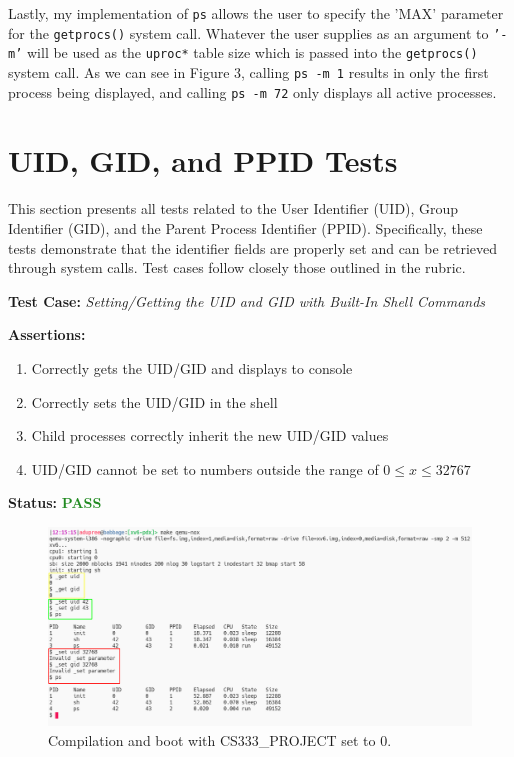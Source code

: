 \documentclass[11pt,letterpaper]{report}
\newcommand{\code}[1]{\colorbox{codegray}{\texttt{#1}}}
\begin{document}
{  Lastly, my implementation of \code{ps} allows the user to specify the 'MAX' parameter
  for the \code{getprocs()} system call. Whatever the user supplies as an argument to
  \code{'-m'} will be used as the \code{uproc*} table size which is passed into the
  \code{getprocs()} system call. As we can see in Figure 3, calling \code{ps -m 1} results
  in only the first process being displayed, and calling \code{ps -m 72} only displays all 
  active processes. 

  \pagebreak

  \section*{UID, GID, and PPID Tests}
  This section presents all tests related to the User Identifier (UID), Group Identifier (GID),
  and the Parent Process Identifier (PPID). Specifically, these tests demonstrate that the
  identifier fields are properly set and can be retrieved through system calls. 
  Test cases follow closely those outlined in the rubric. \hfill \break
  
  \noindent\textbf{Test Case:} \emph{Setting/Getting the UID and GID with Built-In Shell Commands}
  
  \noindent\textbf{Assertions:}
  \begin{enumerate}[]
  \item Correctly gets the UID/GID and displays to console
  \item Correctly sets the UID/GID in the shell
  \item Child processes correctly inherit the new UID/GID values
  \item UID/GID cannot be set to numbers outside the range of $0 \leq x \leq 32767$
  \end{enumerate}  
  
  \noindent\textbf{Status:} \textcolor{ForestGreen}{\textbf{PASS}}
  
  \begin{figure}[h!]
	\centering
	\includegraphics[width=1\linewidth]{built-in-cmds.png}
	\caption[img]{Compilation and boot with CS333\_PROJECT set to 0.}
	\label{fig:P1compileP0-1}
  \end{figure}

}
\end{document}
